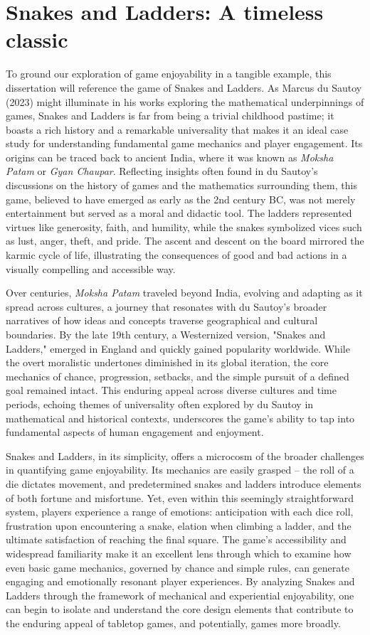 \documentclass[12pt]{report}
\begin{document}
	\section{Snakes and Ladders: A timeless classic}
	To ground our exploration of game enjoyability in a tangible example, this dissertation will reference the game of Snakes and Ladders. As Marcus du Sautoy (2023) might illuminate in his works exploring the mathematical underpinnings of games, Snakes and Ladders is far from being a trivial childhood pastime; it boasts a rich history and a remarkable universality that makes it an ideal case study for understanding fundamental game mechanics and player engagement.  Its origins can be traced back to ancient India, where it was known as \textit{Moksha Patam} or \textit{Gyan Chaupar}.  Reflecting insights often found in du Sautoy's discussions on the history of games and the mathematics surrounding them, this game, believed to have emerged as early as the 2nd century BC, was not merely entertainment but served as a moral and didactic tool. The ladders represented virtues like generosity, faith, and humility, while the snakes symbolized vices such as lust, anger, theft, and pride.  The ascent and descent on the board mirrored the karmic cycle of life, illustrating the consequences of good and bad actions in a visually compelling and accessible way.
	
	Over centuries, \textit{Moksha Patam} traveled beyond India, evolving and adapting as it spread across cultures, a journey that resonates with du Sautoy's broader narratives of how ideas and concepts traverse geographical and cultural boundaries. By the late 19th century, a Westernized version, "Snakes and Ladders," emerged in England and quickly gained popularity worldwide. While the overt moralistic undertones diminished in its global iteration, the core mechanics of chance, progression, setbacks, and the simple pursuit of a defined goal remained intact.  This enduring appeal across diverse cultures and time periods, echoing themes of universality often explored by du Sautoy in mathematical and historical contexts, underscores the game's ability to tap into fundamental aspects of human engagement and enjoyment.
	
	Snakes and Ladders, in its simplicity, offers a microcosm of the broader challenges in quantifying game enjoyability.  Its mechanics are easily grasped – the roll of a die dictates movement, and predetermined snakes and ladders introduce elements of both fortune and misfortune.  Yet, even within this seemingly straightforward system, players experience a range of emotions: anticipation with each dice roll, frustration upon encountering a snake, elation when climbing a ladder, and the ultimate satisfaction of reaching the final square.  The game’s accessibility and widespread familiarity make it an excellent lens through which to examine how even basic game mechanics, governed by chance and simple rules, can generate engaging and emotionally resonant player experiences. By analyzing Snakes and Ladders through the framework of mechanical and experiential enjoyability, one can begin to isolate and understand the core design elements that contribute to the enduring appeal of tabletop games, and potentially, games more broadly.
	
\end{document}
